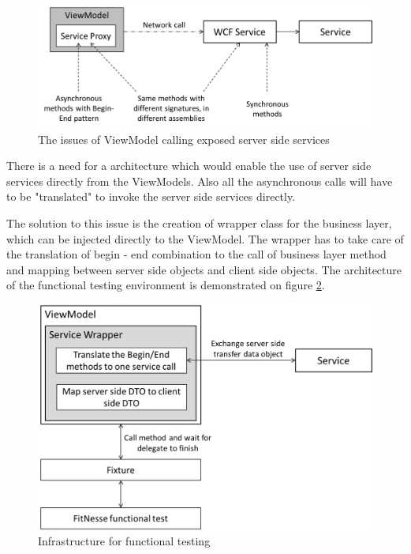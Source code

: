 \begin{figure}[h]
\begin{center}
\includegraphics[width=14cm]{figures/fitnesse_start}
\caption{The issues of ViewModel calling exposed server side services}
\label{fig:fitnesse_start}
\end{center}
\end{figure}

There is a need for a architecture which would enable the use of server side services directly from the ViewModels. Also all the asynchronous calls will have to be "translated" to invoke the server side services directly.

The solution to this issue is the creation of wrapper class for the business layer, which can be injected directly to the ViewModel. The wrapper has to take care of the translation of begin - end combination to the call of business layer method and mapping between server side objects and client side objects. The architecture of the functional testing environment is demonstrated on figure \ref{fig:fitnesse_architecture}.

\begin{figure}[h]
\begin{center}
\includegraphics[width=14cm]{figures/fitnesse_architecture}
\caption{Infrastructure for functional testing}
\label{fig:fitnesse_architecture}
\end{center}
\end{figure}

